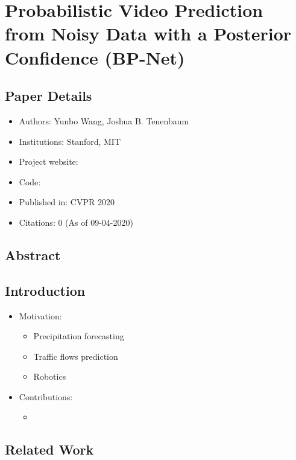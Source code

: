 \documentclass{article}
\begin{document}
    \section{Probabilistic Video Prediction from Noisy Data with a Posterior Confidence (BP-Net)}\label{sec:Probabilistic_Video_Prediction_from_Noisy_Data_with_a_Posterior_Confidence_(BP_Net)}
    \subsection*{Paper Details}
    \begin{itemize}
        \item Authors: Yunbo Wang, Joshua B. Tenenbaum
        \item Institutions: Stanford, MIT
        \item Project website:
        \item Code:
        \item Published in: CVPR 2020
        \item Citations: 0 (As of 09-04-2020)
    \end{itemize}

    \subsection*{Abstract}

    \subsection{Introduction}\label{subsec:Probabilistic_Video_Prediction_from_Noisy_Data_with_a_Posterior_Confidence_(BP_Net):introduction}
    \begin{itemize}
        \item Motivation:
        \begin{itemize}
            \item Precipitation forecasting
            \item Traffic flows prediction
            \item Robotics
        \end{itemize}
        \item Contributions:
        \begin{itemize}
            \item
        \end{itemize}
    \end{itemize}

    \subsection{Related Work}\label{subsec:Probabilistic_Video_Prediction_from_Noisy_Data_with_a_Posterior_Confidence_(BP_Net):related-work}
\end{document}
